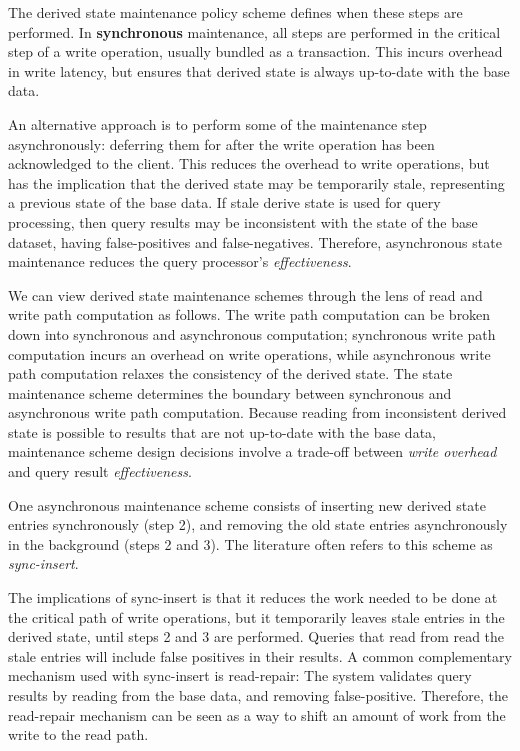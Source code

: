 The derived state maintenance policy scheme defines when these steps are performed.
In \textbf{synchronous} maintenance, all steps are performed in the critical step of a write operation, usually bundled
as a transaction.
This incurs overhead in write latency, but ensures that derived state is always up-to-date with the base data.

An alternative approach is to perform some of the maintenance step asynchronously: deferring them for after the write
operation has been acknowledged to the client.
This reduces the overhead to write operations, but has the implication that the derived state may be temporarily
stale, representing a previous state of the base data.
If stale derive state is used for query processing, then query results may be inconsistent with the state of the base
dataset, having false-positives and false-negatives.
Therefore, asynchronous state maintenance reduces the query processor's \textit{effectiveness}.

\bigskip

We can view derived state maintenance schemes through the lens of read and write path computation as follows.
The write path computation can be broken down into synchronous and asynchronous computation;
synchronous write path computation incurs an overhead on write operations, while asynchronous write path computation
relaxes the consistency of the derived state.
The state maintenance scheme determines the boundary between synchronous and asynchronous write path computation.
Because reading from inconsistent derived state is possible to results that are not up-to-date with the base data,
maintenance scheme design decisions involve a trade-off between \textit{write overhead} and query result
\textit{effectiveness}.

\bigskip

\noindent
One asynchronous maintenance scheme consists of inserting new derived state entries synchronously (step 2),
and removing the old state entries asynchronously in the background (steps 2 and 3).
The literature often refers to this scheme as \textit{sync-insert}.

The implications of sync-insert is that it reduces the work needed to be done at the critical path of write operations,
but it temporarily leaves stale entries in the derived state, until steps 2 and 3 are performed.
Queries that read from read the stale entries will include false positives in their results.
A common complementary mechanism used with sync-insert is read-repair:
The system validates query results by reading from the base data, and removing false-positive.
Therefore, the read-repair mechanism can be seen as a way to shift an amount of work from the write to the read path.

